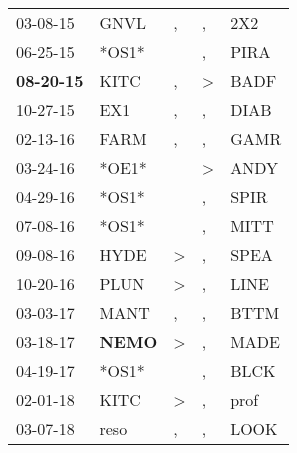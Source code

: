 \begin{supertabular}{p{0.07\textwidth}p{0.06\textwidth}p{0.02\textwidth}p{0.02\textwidth}p{0.06\textwidth}}
          03-08-15\textsuperscript{} &           GNVL\textsuperscript{} &                , &             , &   2X2\textsuperscript{} \\
          06-25-15\textsuperscript{} &                            *OS1* &                  &             , &  PIRA\textsuperscript{} \\
 \textbf{08-20-15\textsuperscript{}} &           KITC\textsuperscript{} &                , &  \textgreater &  BADF\textsuperscript{} \\
          10-27-15\textsuperscript{} &            EX1\textsuperscript{} &                , &             , &  DIAB\textsuperscript{} \\
          02-13-16\textsuperscript{} &           FARM\textsuperscript{} &                , &             , &  GAMR\textsuperscript{} \\
          03-24-16\textsuperscript{} &                            *OE1* &                  &  \textgreater &  ANDY\textsuperscript{} \\
          04-29-16\textsuperscript{} &                            *OS1* &                  &             , &  SPIR\textsuperscript{} \\
          07-08-16\textsuperscript{} &                            *OS1* &                  &             , &  MITT\textsuperscript{} \\
          09-08-16\textsuperscript{} &           HYDE\textsuperscript{} &     \textgreater &             , &  SPEA\textsuperscript{} \\
          10-20-16\textsuperscript{} &           PLUN\textsuperscript{} &     \textgreater &             , &  LINE\textsuperscript{} \\
          03-03-17\textsuperscript{} &           MANT\textsuperscript{} &                , &             , &  BTTM\textsuperscript{} \\
          03-18-17\textsuperscript{} &  \textbf{NEMO\textsuperscript{}} &     \textgreater &             , &  MADE\textsuperscript{} \\
          04-19-17\textsuperscript{} &                            *OS1* &                  &             , &  BLCK\textsuperscript{} \\
          02-01-18\textsuperscript{} &           KITC\textsuperscript{} &     \textgreater &             , &  prof\textsuperscript{} \\
          03-07-18\textsuperscript{} &           reso\textsuperscript{} &                , &             , &  LOOK\textsuperscript{} \\

\end{supertabular}
